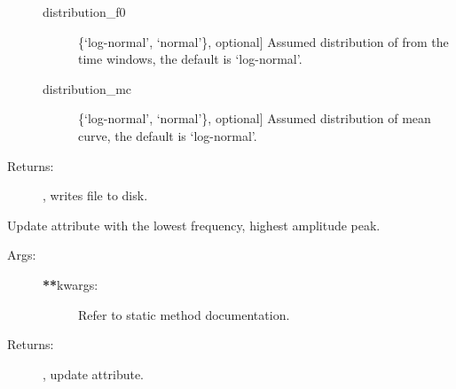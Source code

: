 \documentclass[letterpaper,10pt,english,openany,oneside]{sphinxmanual}
\begin{document}
\begin{fulllineitems}
\begin{fulllineitems}
\begin{description}
\begin{description}
\item[{distribution\_f0}] \leavevmode{[}\{‘log-normal’, ‘normal’\}, optional{]}
Assumed distribution of  from the time windows, the
default is ‘log-normal’.

\item[{distribution\_mc}] \leavevmode{[}\{‘log-normal’, ‘normal’\}, optional{]}
Assumed distribution of mean curve, the default is
‘log-normal’.

\end{description}

\item[{Returns:}] \leavevmode
{}, writes file to disk.

\end{description}

\end{fulllineitems}


\begin{fulllineitems}
\label{\detokenize{index:hvsrpy.Hvsr.update_peaks}}
Update  attribute with the lowest frequency, highest
amplitude peak.
\begin{description}
\item[{Args:}] \leavevmode\begin{description}
\item[{{\color{red}\bfseries{}**}kwargs:}] \leavevmode
Refer to static method  documentation.

\end{description}

\item[{Returns:}] \leavevmode
{}, update  attribute.

\end{description}

\end{fulllineitems}


\end{fulllineitems}




\renewcommand{\indexname}{Index}
\printindex
\end{document}
